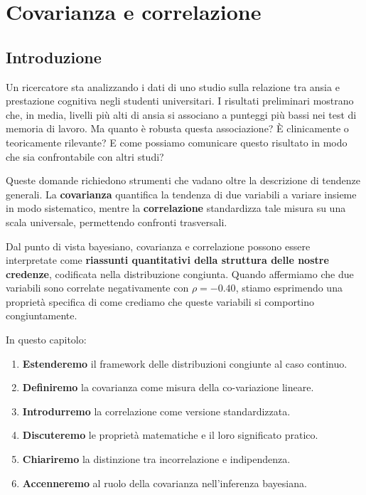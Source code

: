 \documentclass[
  italian,
  letterpaper,
  a4paper,
  11pt,
  open=any]{scrbook}
\providecommand{\tightlist}{%
  \setlength{\itemsep}{0pt}\setlength{\parskip}{0pt}}
\theoremstyle{plain}
\theoremstyle{definition}
\theoremstyle{definition}
\theoremstyle{remark}
\begin{document}
\chapter{Covarianza e correlazione}\label{sec-prob-cov-cor}

\section*{Introduzione}\label{introduzione-8}


Un ricercatore sta analizzando i dati di uno studio sulla relazione tra
ansia e prestazione cognitiva negli studenti universitari. I risultati
preliminari mostrano che, in media, livelli più alti di ansia si
associano a punteggi più bassi nei test di memoria di lavoro. Ma quanto
è robusta questa associazione? È clinicamente o teoricamente rilevante?
E come possiamo comunicare questo risultato in modo che sia
confrontabile con altri studi?

Queste domande richiedono strumenti che vadano oltre la descrizione di
tendenze generali. La \textbf{covarianza} quantifica la tendenza di due
variabili a variare insieme in modo sistematico, mentre la
\textbf{correlazione} standardizza tale misura su una scala universale,
permettendo confronti trasversali.

Dal punto di vista bayesiano, covarianza e correlazione possono essere
interpretate come \textbf{riassunti quantitativi della struttura delle
nostre credenze}, codificata nella distribuzione congiunta. Quando
affermiamo che due variabili sono correlate negativamente con
\(\rho = -0.40\), stiamo esprimendo una proprietà specifica di come
crediamo che queste variabili si comportino congiuntamente.

In questo capitolo:

\begin{enumerate}
\def\labelenumi{\arabic{enumi}.}
\tightlist
\item
  \textbf{Estenderemo} il framework delle distribuzioni congiunte al
  caso continuo.
\item
  \textbf{Definiremo} la covarianza come misura della co-variazione
  lineare.
\item
  \textbf{Introdurremo} la correlazione come versione standardizzata.
\item
  \textbf{Discuteremo} le proprietà matematiche e il loro significato
  pratico.
\item
  \textbf{Chiariremo} la distinzione tra incorrelazione e indipendenza.
\item
  \textbf{Accenneremo} al ruolo della covarianza nell'inferenza
  bayesiana.
\end{enumerate}
\end{document}
